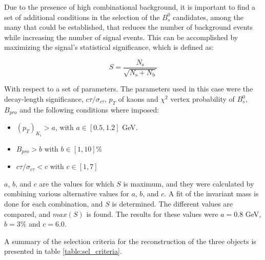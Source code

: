 Due to the presence of high combinational background, it is important to find a set of additional conditions in the selection of the $B^0_s$ candidates, among the many that could be established, that reduces the number of background events while increasing the number of signal events. This can be accomplished by maximizing the signal's statistical significance, which is defined as:

\begin{equation}
	\label{eq:sig}
	S = \frac{N_{\text{s}}}{\sqrt{N_{\text{s}} + N_{\text{b}}}}
\end{equation}

With respect to a set of parameters. The parameters used in this case were the decay-length significance, $c\tau / \sigma_{c\tau}$, $p_T$ of kaons and $\chi^2$ vertex probability of $B^0_s$, $B_{pro}$ and the following conditions where imposed:

\begin{itemize}
	\item  $(p_T)_{K_i} > a$, with $a \in [0.5, 1.2]$ GeV.
	\item $B_{pro} > b$ with $b \in [1, 10] \%$ 
	\item $c\tau / \sigma_{c\tau} < c$ with $c \in [1, 7]$
\end{itemize}

$a$, $b$, and $c$ are the values for which $S$ is maximum, and they were calculated by combining various alternative values for $a$, $b$, and $c$. A fit of the invariant mass is done for each combination, and $S$ is determined. The different values are compared, and $max(S)$ is found. The results for these values were $a = 0.8$ GeV, $b = 3\%$ and $c = 6.0$.

A summary of the selection criteria for the reconstruction of the three objects is presented in table \ref{table:sel_criteria}.

